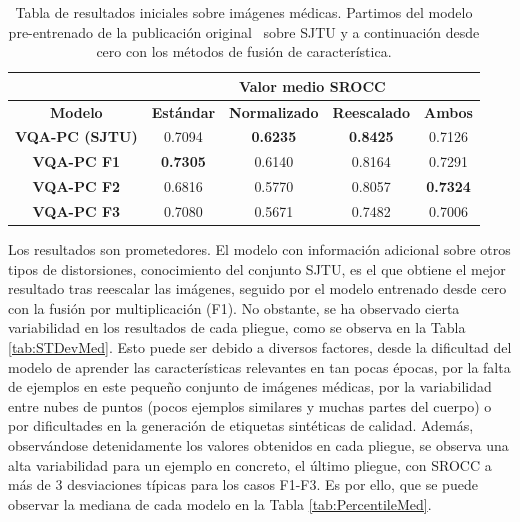\begin{table}[htp]
  \scriptsize
  \centering
\begin{tabular}{|c|cccc|}
\hline
\rowcolor[HTML]{FFC702}
                       & \multicolumn{4}{c|}{\textbf{Valor medio SROCC}}                                                                                                    \\ \hline
\rowcolor[HTML]{FFC702}
\textbf{Modelo}        & \multicolumn{1}{c|}{\textbf{Estándar}} & \multicolumn{1}{c|}{\textbf{Normalizado}} & \multicolumn{1}{c|}{\textbf{Reescalado}} & \textbf{Ambos}  \\ \hline
\textbf{VQA-PC (SJTU)} & \multicolumn{1}{c|}{0.7094}            & \multicolumn{1}{c|}{\textbf{0.6235}}      & \multicolumn{1}{c|}{\textbf{0.8425}}    & 0.7126          \\ \hline
\textbf{VQA-PC F1}     & \multicolumn{1}{c|}{\textbf{0.7305}}   & \multicolumn{1}{c|}{0.6140}               & \multicolumn{1}{c|}{0.8164}             & 0.7291          \\ \hline
\textbf{VQA-PC F2}     & \multicolumn{1}{c|}{0.6816}            & \multicolumn{1}{c|}{0.5770}               & \multicolumn{1}{c|}{0.8057}             & \textbf{0.7324} \\ \hline
\textbf{VQA-PC F3}     & \multicolumn{1}{c|}{0.7080}            & \multicolumn{1}{c|}{0.5671}      & \multicolumn{1}{c|}{0.7482}             & 0.7006          \\ \hline
\end{tabular}
\caption[Valor medio sobre imágenes médicas.]{Tabla de resultados iniciales sobre imágenes médicas. 
Partimos del modelo pre-entrenado de la publicación original~\cite{VQA-PC} sobre SJTU y 
a continuación desde cero con los métodos de fusión de característica.
}
\label{tab:SroccMedRes}
\end{table}

Los resultados son prometedores. El modelo con información adicional sobre otros 
tipos de distorsiones, conocimiento del conjunto SJTU, es el que obtiene el mejor 
resultado tras reescalar las imágenes, seguido por el modelo entrenado desde cero 
con la fusión por multiplicación (F1). No obstante, se ha observado cierta 
variabilidad en los resultados de cada pliegue, como se observa en la Tabla \ref{tab:STDevMed}.
Esto puede ser debido a diversos factores, desde la dificultad del modelo de 
aprender las características relevantes en tan pocas épocas, por la falta 
de ejemplos en este pequeño conjunto de imágenes médicas, por la variabilidad 
entre nubes de puntos (pocos ejemplos similares y muchas partes del cuerpo) 
o por dificultades en la generación de etiquetas sintéticas de calidad. 
Además, observándose detenidamente los valores obtenidos en cada pliegue, 
se observa una alta variabilidad para un ejemplo en concreto, el último pliegue, 
con SROCC a más de 3 desviaciones típicas para los casos F1-F3.  Es por ello, 
que se puede observar la mediana de cada modelo en la Tabla \ref{tab:PercentileMed}.


